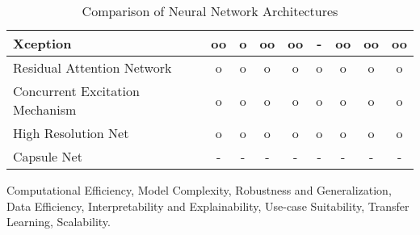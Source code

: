 \begin{landscape}
\begin{table}[ht]
\begin{tabular}{|l|c|c|c|c|c|c|c|c|}
Xception & oo & o & oo & oo & - & oo & oo & oo \\ \hline
Residual Attention Network & o & o & o & o & o & o & o & o \\ \hline
Concurrent Excitation Mechanism & o & o & o & o & o & o & o & o \\ \hline
High Resolution Net & o & o & o & o & o & o & o & o \\ \hline
Capsule Net & - & - & - & - & - & - & - & - \\ \hline
\end{tabular}
\caption{Comparison of Neural Network Architectures}
\label{table:nn_comparison}
\end{table}
Computational Efficiency, Model Complexity, Robustness and Generalization, Data Efficiency, Interpretability and Explainability, Use-case Suitability, Transfer Learning, Scalability.
\end{landscape}
